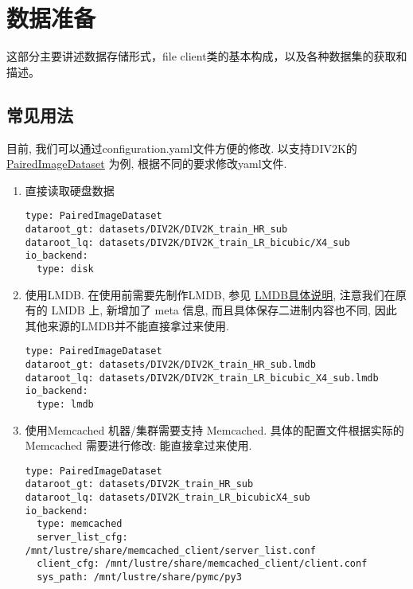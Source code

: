 \documentclass[../main.tex]{subfiles}
\begin{document}
\chapter{数据准备}
\vspace{-2cm}
这部分主要讲述数据存储形式，file client类的基本构成，以及各种数据集的获取和描述。

\section{常见用法}
目前, 我们可以通过configuration.yaml文件方便的修改. 以支持DIV2K的 \href{https://github.com/XPixelGroup/BasicSR/blob/master/basicsr/data/paired_image_dataset.py}{PairedImageDataset} 为例, 根据不同的要求修改yaml文件.

\begin{enumerate}

\item 直接读取硬盘数据
\begin{verbatim}
type: PairedImageDataset
dataroot_gt: datasets/DIV2K/DIV2K_train_HR_sub
dataroot_lq: datasets/DIV2K/DIV2K_train_LR_bicubic/X4_sub
io_backend:
  type: disk
\end{verbatim}

\item 使用LMDB. 在使用前需要先制作LMDB, 参见 \href{https://github.com/XPixelGroup/BasicSR/blob/master/docs/DatasetPreparation_CN.md#LMDB%E5%85%B7%E4%BD%93%E8%AF%B4%E6%98%8E}{LMDB具体说明}, 注意我们在原有的 LMDB 上, 新增加了 meta 信息, 而且具体保存二进制内容也不同, 因此其他来源的LMDB并不能直接拿过来使用.
\begin{verbatim}
type: PairedImageDataset
dataroot_gt: datasets/DIV2K/DIV2K_train_HR_sub.lmdb
dataroot_lq: datasets/DIV2K/DIV2K_train_LR_bicubic_X4_sub.lmdb
io_backend:
  type: lmdb
\end{verbatim}

\item 使用Memcached 机器/集群需要支持 Memcached. 具体的配置文件根据实际的 Memcached 需要进行修改:
能直接拿过来使用.
\begin{verbatim}
type: PairedImageDataset
dataroot_gt: datasets/DIV2K_train_HR_sub
dataroot_lq: datasets/DIV2K_train_LR_bicubicX4_sub
io_backend:
  type: memcached
  server_list_cfg: /mnt/lustre/share/memcached_client/server_list.conf
  client_cfg: /mnt/lustre/share/memcached_client/client.conf
  sys_path: /mnt/lustre/share/pymc/py3
\end{verbatim}

\end{enumerate}
\end{document}
